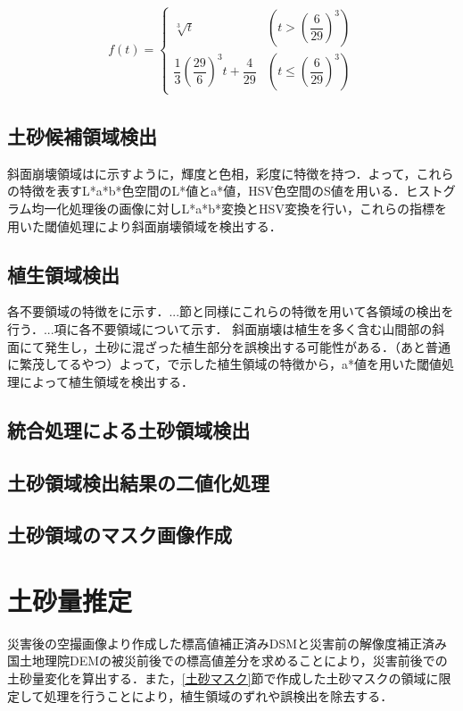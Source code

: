       \begin{eqnarray}
        \label{Lab表色系4}
          f(t) = 
          \left\{
            \begin{array}{lll}
              \sqrt[3]{t} 
                &(t >    (\dfrac{6} {29})^3) \\
              \dfrac{1} {3} (\dfrac{29} {6})^3 t + \dfrac{4} {29}
                &(t \leq (\dfrac{6} {29})^3)
            \end{array}
          \right.
      \end{eqnarray}

    \subsection{土砂候補領域検出}
      斜面崩壊領域は\tref{}に示すように，輝度と色相，彩度に特徴を持つ．よって，これらの特徴を表すL*a*b*色空間のL*値とa*値，HSV色空間のS値を用いる．ヒストグラム均一化処理後の画像に対しL*a*b*変換とHSV変換を行い，これらの指標を用いた閾値処理により斜面崩壊領域を検出する．

    \subsection{植生領域検出}
      \label{植生除去}
      各不要領域の特徴を\Fref{}に示す．...節と同様にこれらの特徴を用いて各領域の検出を行う．...項に各不要領域について示す．
      斜面崩壊は植生を多く含む山間部の斜面にて発生し，土砂に混ざった植生部分を誤検出する可能性がある．（あと普通に繁茂してるやつ）よって，\Fref{}で示した植生領域の特徴から，a*値を用いた閾値処理によって植生領域を検出する．

    \subsection{統合処理による土砂領域検出}
    \subsection{土砂領域検出結果の二値化処理}
    \subsection{土砂領域のマスク画像作成}

  
  \section{土砂量推定}
    \label{土砂量推定}
    災害後の空撮画像より作成した標高値補正済みDSMと災害前の解像度補正済み国土地理院DEMの被災前後での標高値差分を求めることにより，災害前後での土砂量変化を算出する．また，\ref{土砂マスク}節で作成した土砂マスクの領域に限定して処理を行うことにより，植生領域のずれや誤検出を除去する．
  

